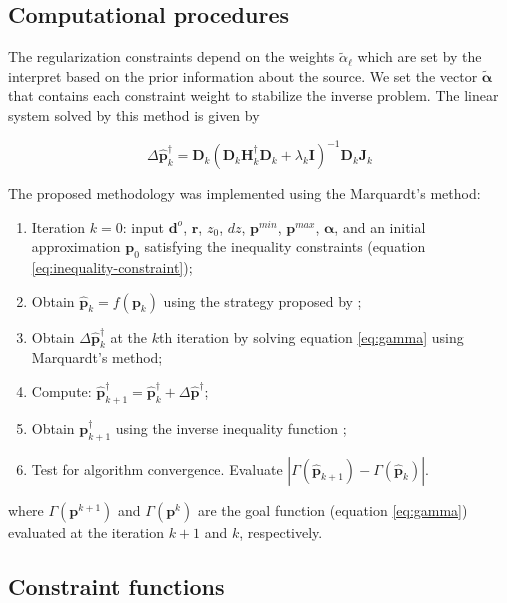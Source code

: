 \subsection{Computational procedures}

The regularization constraints depend on the weights $\tilde{\alpha}_\ell$ which are set by the interpret based on the prior information about the source. We set the vector $\tilde{\boldsymbol{\alpha}}$ that contains each constraint weight to stabilize the inverse problem. The linear system solved by this method is given by

\begin{equation}\label{eq:linear-system}
\Delta\hat{\mathbf{p}}^{\dagger}_k = \mathbf{D}_k\left(\mathbf{D}_k\mathbf{H}^\dagger_k\mathbf{D}_k+\lambda_k\mathbf{I}\right)^{-1}\mathbf{D}_k\mathbf{J}_k
\end{equation}


The proposed methodology was implemented using the Marquardt's method:

\begin{enumerate}
	\item Iteration $k = 0$: input $\mathbf{d}^o$, $\mathbf{r}$, $z_0$, $dz$, $\mathbf{p}^{min}$, $\mathbf{p}^{max}$, $\boldsymbol{\alpha}$, and an initial approximation $\mathbf{p}_0$ satisfying the inequality constraints (equation \ref{eq:inequality-constraint});
	\item Obtain $\hat{\mathbf{p}}_k = f(\mathbf{p}_k)$ using the strategy proposed by \cite{barbosa-etal1999};
	\item Obtain $\Delta\hat{\mathbf{p}}^{\dagger}_k$ at the $k$th iteration by solving equation \ref{eq:gamma} using Marquardt’s method;
	\item Compute: $\hat{\mathbf{p}}_{k+1}^{\dagger} = \hat{\mathbf{p}}^{\dagger}_k + \Delta\hat{\mathbf{p}}^{\dagger}$;
	\item Obtain $\mathbf{p}_{k+1}^{\dagger}$ using the inverse inequality function \citet{barbosa-etal1999};
	\item Test for algorithm convergence. Evaluate $\left|\Gamma(\hat{\mathbf{p}}_{k+1}) - \Gamma(\hat{\mathbf{p}}_k)\right|$.
\end{enumerate}
where  $ \Gamma(\mathbf{p}^{k+1}) $ and $\Gamma(\mathbf{p}^{k})$ are the goal function (equation \ref{eq:gamma}) evaluated at the iteration $k+1$ and $k$, respectively.

\subsection{Constraint functions}


